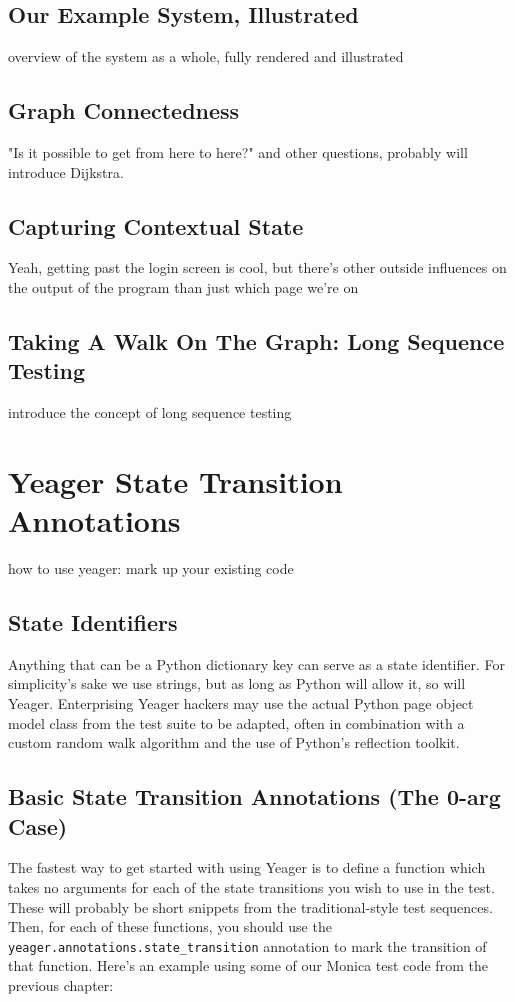 \subsection{Our Example System, Illustrated}
overview of the system as a whole, fully rendered and illustrated %

\subsection{Graph Connectedness}
"Is it possible to get from here to here?" and other questions, probably will introduce Dijkstra. %

\subsection{Capturing Contextual State}
Yeah, getting past the login screen is cool, but there's other outside influences on the output of the program than just which page we're on %

\subsection{Taking A Walk On The Graph: Long Sequence Testing}
introduce the concept of long sequence testing %

\section{Yeager State Transition Annotations}
how to use yeager: mark up your existing code %

\subsection{State Identifiers}
Anything that can be a Python dictionary key can serve as a state identifier. For simplicity's sake we use strings, but as long as Python will allow it, so will Yeager. Enterprising Yeager hackers may use the actual Python page object model class from the test suite to be adapted, often in combination with a custom random walk algorithm and the use of Python's reflection toolkit.%

\subsection{Basic State Transition Annotations (The 0-arg Case)}
The fastest way to get started with using Yeager is to define a function which takes no arguments for each of the state transitions you wish to use in the test. These will probably be short snippets from the traditional-style test sequences. Then, for each of these functions, you should use the \texttt{yeager.annotations.state\_transition} annotation to mark the transition of that function. Here's an example using some of our Monica test code from the previous chapter:

